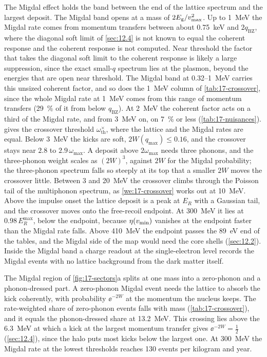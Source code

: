 The Migdal effect holds the band between the end of the lattice spectrum and the largest deposit. The Migdal band opens at a mass of $2E_{\mathrm{g}}/v_{\mathrm{max}}^2$. Up to \SI{1}{MeV} the Migdal rate comes from momentum transfers between about \SI{0.75}{keV} and $2q_{\mathrm{BZ}}$, where the diagonal soft limit of \cref{sec:12.4} is not known to equal the coherent response and the coherent response is not computed. Near threshold the factor that takes the diagonal soft limit to the coherent response is likely a large suppression, since the exact small-$q$ spectrum lies at the plasmon, beyond the energies that are open near threshold. The Migdal band at 0.32--\SI{1}{MeV} carries this unsized coherent factor, and so does the \SI{1}{MeV} column of \cref{tab:17-crossover}, since the whole Migdal rate at \SI{1}{MeV} comes from this range of momentum transfers (\SI{29}{\percent} of it from below $q_{\mathrm{BZ}}$). At \SI{2}{MeV} the coherent factor acts on a third of the Migdal rate, and from \SI{3}{MeV} on, on \SI{7}{\percent} or less (\cref{tab:17-nuisances}).  gives the crossover threshold $\omega_{\mathrm{th}}^\times$, where the lattice and the Migdal rates are equal. Below \SI{3}{MeV} the kicks are soft, $2W(q_{\mathrm{max}}) \le 0.16$, and the crossover stays near $2.8$ to $2.9\,\omega_{\mathrm{max}}$. A deposit above $2\omega_{\mathrm{max}}$ needs three phonons, and the three-phonon weight scales as $(2W)^3$, against $2W$ for the Migdal probability; the three-phonon spectrum falls so steeply at its top that a smaller $2W$ moves the crossover little. Between 3 and \SI{20}{MeV} the crossover climbs through the Poisson tail of the multiphonon spectrum, as \cref{we:17-crossover} works out at \SI{10}{MeV}. Above the impulse onset the lattice deposit is a peak at $E_R$ with a Gaussian tail, and the crossover moves onto the free-recoil endpoint. At \SI{300}{MeV} it lies at $0.98\,E_R^{\mathrm{max}}$, below the endpoint, because $\eta(v_{\mathrm{min}})$ vanishes at the endpoint faster than the Migdal rate falls. Above \SI{410}{MeV} the endpoint passes the \SI{89}{eV} end of the tables, and the Migdal side of the map would need the core shells (\cref{sec:12.2}). Inside the Migdal band a charge readout at the single-electron level records the Migdal events with no lattice background from the dark matter itself.

The Migdal region of \cref{fig:17-sectors}a splits at one mass into a zero-phonon and a phonon-dressed part. A zero-phonon Migdal event needs the lattice to absorb the kick coherently, with probability $\ee^{-2W}$ at the momentum the nucleus keeps. The rate-weighted share of zero-phonon events falls with mass (\cref{tab:17-crossover}), and it equals the phonon-dressed share at \SI{13.2}{MeV}. This crossing lies above the \SI{6.3}{MeV} at which a kick at the largest momentum transfer gives $\ee^{-2W} = \tfrac12$ (\cref{sec:12.4}), since the halo puts most kicks below the largest one. At \SI{300}{MeV} the Migdal rate at the lowest thresholds reaches 130 events per kilogram and year.

